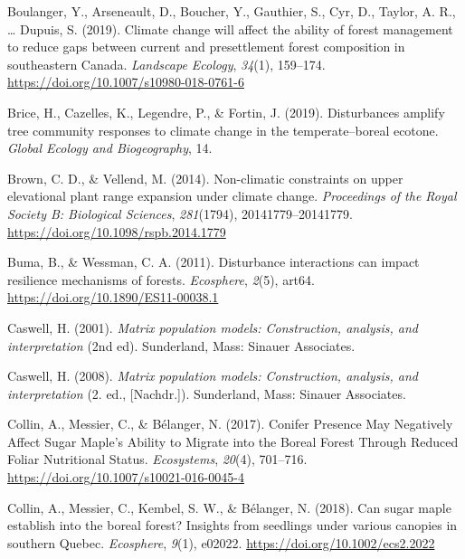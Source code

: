 \documentclass[a4paperpaper,]{article}
\begin{document}
\leavevmode\hypertarget{ref-boulanger_climate_2019}{}%
Boulanger, Y., Arseneault, D., Boucher, Y., Gauthier, S., Cyr, D.,
Taylor, A. R., \ldots{} Dupuis, S. (2019). Climate change will affect
the ability of forest management to reduce gaps between current and
presettlement forest composition in southeastern Canada. \emph{Landscape
Ecology}, \emph{34}(1), 159--174.
\url{https://doi.org/10.1007/s10980-018-0761-6}

\leavevmode\hypertarget{ref-brice_disturbances_2019}{}%
Brice, H., Cazelles, K., Legendre, P., \& Fortin, J. (2019).
Disturbances amplify tree community responses to climate change in the
temperate--boreal ecotone. \emph{Global Ecology and Biogeography}, 14.

\leavevmode\hypertarget{ref-brown_non-climatic_2014}{}%
Brown, C. D., \& Vellend, M. (2014). Non-climatic constraints on upper
elevational plant range expansion under climate change.
\emph{Proceedings of the Royal Society B: Biological Sciences},
\emph{281}(1794), 20141779--20141779.
\url{https://doi.org/10.1098/rspb.2014.1779}

\leavevmode\hypertarget{ref-buma_disturbance_2011}{}%
Buma, B., \& Wessman, C. A. (2011). Disturbance interactions can impact
resilience mechanisms of forests. \emph{Ecosphere}, \emph{2}(5), art64.
\url{https://doi.org/10.1890/ES11-00038.1}

\leavevmode\hypertarget{ref-caswell_matrix_2001}{}%
Caswell, H. (2001). \emph{Matrix population models: Construction,
analysis, and interpretation} (2nd ed). Sunderland, Mass: Sinauer
Associates.

\leavevmode\hypertarget{ref-caswell_matrix_2008}{}%
Caswell, H. (2008). \emph{Matrix population models: Construction,
analysis, and interpretation} (2. ed., {[}Nachdr.{]}). Sunderland, Mass:
Sinauer Associates.

\leavevmode\hypertarget{ref-collin_conifer_2017}{}%
Collin, A., Messier, C., \& Bélanger, N. (2017). Conifer Presence May
Negatively Affect Sugar Maple's Ability to Migrate into the Boreal
Forest Through Reduced Foliar Nutritional Status. \emph{Ecosystems},
\emph{20}(4), 701--716. \url{https://doi.org/10.1007/s10021-016-0045-4}

\leavevmode\hypertarget{ref-collin_can_2018}{}%
Collin, A., Messier, C., Kembel, S. W., \& Bélanger, N. (2018). Can
sugar maple establish into the boreal forest? Insights from seedlings
under various canopies in southern Quebec. \emph{Ecosphere},
\emph{9}(1), e02022. \url{https://doi.org/10.1002/ecs2.2022}
\end{document}
